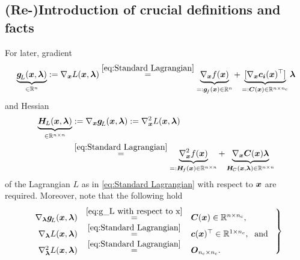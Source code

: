 \documentclass[journal]{IEEEtranTIE}
\newcommand{\CHHA}[1]{{\color{red} [CH: #1]}} %
\newcommand{\KYCH}[1]{{\color{blue} [KC: #1]}} %
\begin{document}
\subsection{(Re-)Introduction of crucial definitions and facts}
For later, gradient 
%
\begin{align}
    \underbrace{\mv{g}_{\! L}(\mv{x},\mv{\lambda})}_{\in \R^n} 
    := 
    \nabla_{\mv{x}} L(\mv{x},\mv{\lambda}) 
    \stackrel{\eqref{eq:Standard Lagrangian}}{=} 
    \underbrace{\nabla_{\mv{x}} f(\mv{x})}_{=:\mv{g}_{\! f}(\mv{x}) \in \R^n} 
    +
    \underbrace{[\nabla_{\mv{x}} \mv{c_i}(\mv{x})^\top]}_{=:\mm{C}(\mv{x}) \in \R^{n \times n_{\rm c} }} \mv{\lambda} 
\label{eq:g_L with respect to x}
\end{align}
%
and Hessian 
%
\begin{align}
\underbrace{\mm{H}_{\! L}(\mv{x},\mv{\lambda})}_{\in \R^{n \times n}} 
    & :=  \nabla_{\mv{x}} \mv{g}_{\! L}(\mv{x},\mv{\lambda}) := \nabla_{\mv{x}}^2 L(\mv{x},\mv{\lambda})  \notag \\
    & \stackrel{\eqref{eq:Standard Lagrangian}}{=} \underbrace{\nabla_{\mv{x}}^2 f(\mv{x})}_{=:\mm{H}_{\! f}(\mv{x}) \in \R^{n \times n}} + \underbrace{\nabla_{\mv{x}}  \mm{C}(\mv{x})\mv{\lambda}}_{\mm{H}_{\!C}(\mv{x},\mv{\lambda}) \in \R^{n \times n} }
\label{eq:H_L with respect to x}
\end{align}
%
of the Lagrangian $L$ as in \eqref{eq:Standard Lagrangian} with respect to $\boldsymbol{x}$ are required.
Moreover, note that the following hold
%
\begin{equation}
\left.\begin{array}{rcl}
 \nabla_{\mv{\lambda}} \mv{g}_{\! L}(\mv{x},\mv{\lambda}) & \stackrel{\eqref{eq:g_L with respect to x}}{=} & \mm{C}(\mv{x})  \in \R^{n \times n_{\rm c}}, \\ 
 \nabla_{\mv{\lambda}} L(\mv{x},\mv{\lambda}) & \stackrel{\eqref{eq:Standard Lagrangian}}{=} & \mv{c}(\mv{x})^\top \in \R^{1 \times n_{\rm c}}, \; \text{ and }\\ 
 \nabla_{\mv{\lambda}}^2 L(\mv{x},\mv{\lambda}) & \stackrel{\eqref{eq:Standard Lagrangian}}{=} & \mm{O}_{n_{\rm c} \times n_{\rm c}}.
 \end{array}\right\}
\label{eq:nabla_lambda g_L, nabla_lambda L and nabla_lambda^2 L}
\end{equation}
\end{document}
